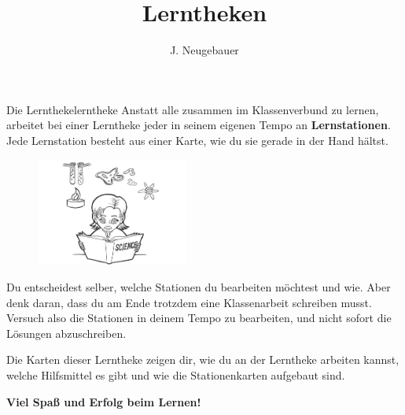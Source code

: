 \documentclass[12pt,a5paper,landscape]{scrartcl}
\author{J. Neugebauer}
\title{Lerntheken}
\date{\Heute}
\begin{document}
\begin{hilfekarte}{Die Lerntheke}{lerntheke}
	Anstatt alle zusammen im Klassenverbund zu lernen, arbeitet bei einer Lerntheke jeder in seinem eigenen Tempo an \textbf{Lernstationen}. Jede Lernstation besteht aus einer Karte, wie du sie gerade in der Hand hältst.

	\medskip
	\begin{figure}
	\includegraphics[width=5cm]{0.1-LT-Abb_Lernen}
	\end{figure}	
	Du entscheidest selber, welche Stationen du bearbeiten möchtest und wie. Aber denk daran, dass du am Ende trotzdem eine Klassenarbeit schreiben musst. Versuch also die Stationen in deinem Tempo zu bearbeiten, und nicht sofort die Lösungen abzuschreiben.
	
	\medskip
	Die Karten dieser Lerntheke zeigen dir, wie du an der Lerntheke arbeiten kannst, welche Hilfsmittel es gibt und wie die Stationenkarten aufgebaut sind.
	
	\medskip
	\begin{center}\large\bfseries
		Viel Spaß und Erfolg beim Lernen!
	\end{center}
\end{hilfekarte}
\end{document}

